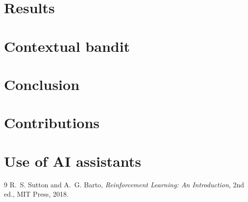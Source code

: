 \documentclass[11pt,a4paper]{article}
\begin{document}
\section{Results}                     %
\label{sec:results}

\section{Contextual bandit}           %
\label{sec:contextual}

\section{Conclusion}                  %

\section*{Contributions}

\section*{Use of AI assistants}

\begin{thebibliography}{9}
 R.~S. Sutton and A.~G. Barto,
  \emph{Reinforcement Learning: An Introduction}, 2nd ed., MIT Press, 2018.
\end{thebibliography}
\end{document}
